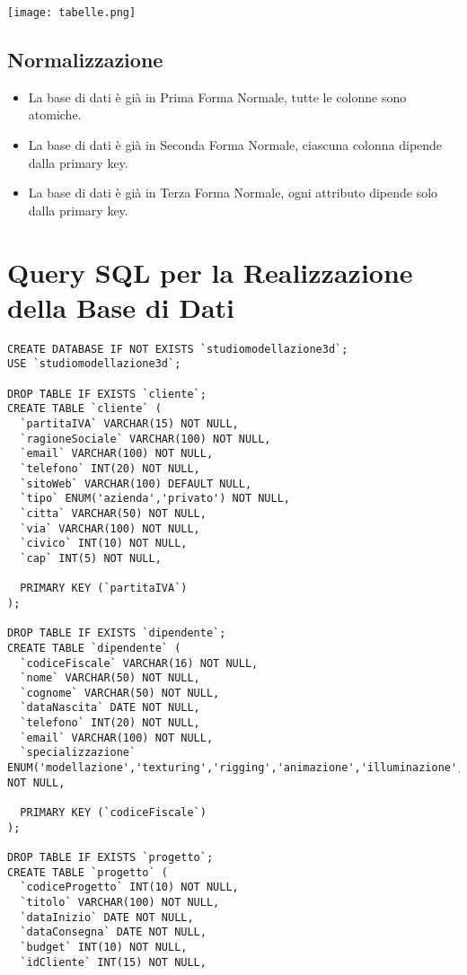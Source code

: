 \documentclass[a4paper,11pt]{article}
\begin{document}
{\begin{itemize}
\end{itemize}

\texttt{[image: tabelle.png]}

\newpage

\subsection{Normalizzazione}
\begin{itemize}
  \item La base di dati è già in Prima Forma Normale, tutte le colonne sono atomiche.
  \item La base di dati è già in Seconda Forma Normale, ciascuna colonna dipende dalla primary key.
  \item La base di dati è già in Terza Forma Normale, ogni attributo dipende solo dalla primary key.
\end{itemize}

\newpage

\section{Query SQL per la Realizzazione della Base di Dati}

\begin{lstlisting}[style=SQL]
CREATE DATABASE IF NOT EXISTS `studiomodellazione3d`;
USE `studiomodellazione3d`;

DROP TABLE IF EXISTS `cliente`;
CREATE TABLE `cliente` (
  `partitaIVA` VARCHAR(15) NOT NULL,
  `ragioneSociale` VARCHAR(100) NOT NULL,
  `email` VARCHAR(100) NOT NULL,
  `telefono` INT(20) NOT NULL,
  `sitoWeb` VARCHAR(100) DEFAULT NULL,
  `tipo` ENUM('azienda','privato') NOT NULL,
  `citta` VARCHAR(50) NOT NULL,
  `via` VARCHAR(100) NOT NULL,
  `civico` INT(10) NOT NULL,
  `cap` INT(5) NOT NULL,
  
  PRIMARY KEY (`partitaIVA`)
);

DROP TABLE IF EXISTS `dipendente`;
CREATE TABLE `dipendente` (
  `codiceFiscale` VARCHAR(16) NOT NULL,
  `nome` VARCHAR(50) NOT NULL,
  `cognome` VARCHAR(50) NOT NULL,
  `dataNascita` DATE NOT NULL,
  `telefono` INT(20) NOT NULL,
  `email` VARCHAR(100) NOT NULL,
  `specializzazione` ENUM('modellazione','texturing','rigging','animazione','illuminazione','rendering') NOT NULL,
  
  PRIMARY KEY (`codiceFiscale`)
);

DROP TABLE IF EXISTS `progetto`;
CREATE TABLE `progetto` (
  `codiceProgetto` INT(10) NOT NULL,
  `titolo` VARCHAR(100) NOT NULL,
  `dataInizio` DATE NOT NULL,
  `dataConsegna` DATE NOT NULL,
  `budget` INT(10) NOT NULL,
  `idCliente` INT(15) NOT NULL,
  

\end{lstlisting}}
\end{document}
